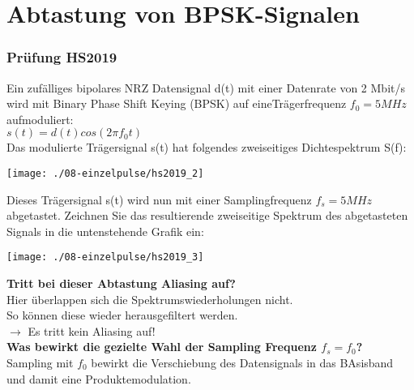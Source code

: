 

\section{Abtastung von BPSK-Signalen}

\subsubsection{Prüfung HS2019}
Ein zufälliges bipolares NRZ Datensignal d(t) mit einer Datenrate von 2 Mbit/s wird mit Binary Phase Shift Keying (BPSK) auf eineTrägerfrequenz $f_0 = 5 MHz$ aufmoduliert:\\
$s(t)=d(t)cos(2\pi f_0t)$\\

Das modulierte Trägersignal s(t) hat folgendes zweiseitiges Dichtespektrum S(f):\\
\begin{center}
    \vspace{-8pt}
    \texttt{[image: ./08-einzelpulse/hs2019\_2]}
    \vspace{-8pt}
\end{center}

Dieses Trägersignal s(t) wird nun mit einer Samplingfrequenz $f_s = 5 MHz$ abgetastet. Zeichnen Sie das resultierende zweiseitige Spektrum des abgetasteten Signals in die
untenstehende Grafik ein:
\begin{center}
    \vspace{-8pt}
    \texttt{[image: ./08-einzelpulse/hs2019\_3]}
    \vspace{-8pt}
\end{center}

\textbf{Tritt bei dieser Abtastung Aliasing auf?}\\
Hier überlappen sich die Spektrumswiederholungen nicht.\\
So können diese wieder herausgefiltert werden.\\
$\rightarrow$ Es tritt kein Aliasing auf!\\

\textbf{Was bewirkt die gezielte Wahl der Sampling Frequenz $f_s = f_0$?}\\
Sampling mit $f_0$ bewirkt die Verschiebung des Datensignals in das BAsisband und damit eine Produktemodulation.\\

